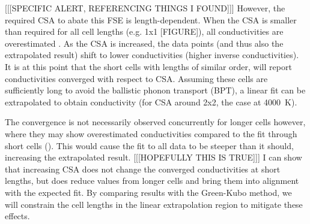 [[[SPECIFIC ALERT, REFERENCING THINGS I FOUND]]] However, the required CSA to abate this FSE is length-dependent. When the CSA is smaller than required for all cell lengths (e.g. 1x1 [FIGURE]), all conductivities are overestimated \citep{Thomas2010}. As the CSA is increased, the data points (and thus also the extrapolated result) shift to lower conductivities (higher inverse conductivities). It is at this point that the short cells with lengths of similar order, will report conductivities converged with respect to CSA. Assuming these cells are sufficiently long to avoid the ballistic phonon transport (BPT), a linear fit can be extrapolated to obtain conductivity (for CSA around 2x2, the case at 4000~K). 

The convergence is not necessarily observed concurrently for longer cells however, where they may show overestimated conductivities compared to the fit through short cells (\cite{Hu2011}). This would cause the fit to all data to be steeper than it should, increasing the extrapolated result.  [[[HOPEFULLY THIS IS TRUE]]] I can show that increasing CSA does not change the converged conductivities at short lengths, but does reduce values from longer cells and bring them into alignment with the expected fit. By comparing results with the Green-Kubo method, we will constrain the cell lengths in the linear extrapolation region to mitigate these effects.















